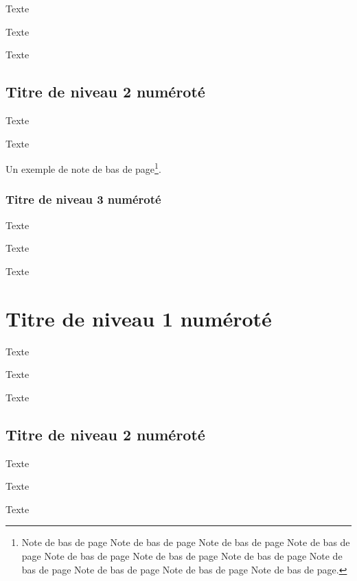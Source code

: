 \documentclass[12pt, a4paper]{article}
\begin{document}
Texte

Texte

Texte

\subsection{Titre de niveau 2 numéroté}

Texte

Texte

Un exemple de note de bas de page\footnote{Note de bas de page Note de bas de page Note de bas de page Note de bas de page Note de bas de page Note de bas de page Note de bas de page Note de bas de page Note de bas de page Note de bas de
page Note de bas de page.}.

\subsubsection{Titre de niveau 3 numéroté}

Texte

Texte

Texte


\section{Titre de niveau 1 numéroté}

Texte

Texte

Texte

\subsection{Titre de niveau 2 numéroté}

Texte

Texte

Texte

\nocite{*}
%
%
\end{document}
